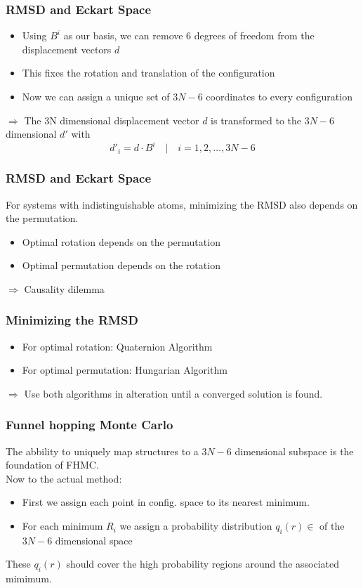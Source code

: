 \documentclass{beamer}
\begin{document}
	\begin{frame}
		\frametitle{RMSD and Eckart Space}
		\begin{itemize}
			\item Using $B^i$ as our basis, we can remove 6 degrees of freedom from the displacement vectors $d$
			\item This fixes the rotation and translation of the configuration
			\item Now we can assign a unique set of $3N-6$ coordinates to every configuration
		\end{itemize}
		$\Longrightarrow$ The 3N dimensional displacement vector $d$ is transformed to the $3N-6$ dimensional $d'$ with
		\begin{equation}
			d'_i=d\cdot B^i\quad|\quad i=1,2,\ldots, 3N-6
		\end{equation}
	\end{frame}

	\begin{frame}
		\frametitle{RMSD and Eckart Space}
		For systems with indistinguishable atoms, minimizing the RMSD also depends on the permutation.
		\begin{itemize}
			\item Optimal rotation depends on the permutation
			\item Optimal permutation depends on the rotation
		\end{itemize}
		$\Longrightarrow$ Causality dilemma
	\end{frame}

	\begin{frame}
		\frametitle{Minimizing the RMSD}
		\begin{itemize}
			\item For optimal rotation: Quaternion Algorithm \cite{Coutsias2004}
			\item For optimal permutation: Hungarian Algorithm \cite{Kuhn1955}
		\end{itemize}
		$\Longrightarrow$ Use both algorithms in alteration until a converged solution is found.
	\end{frame}

	\begin{frame}
		\frametitle{Funnel hopping Monte Carlo}
		The abbility to uniquely map structures to a $3N-6$ dimensional subspace is the foundation of FHMC.\\
		Now to the actual method:
		\begin{itemize}
			\item First we assign each point in config. space to its nearest minimum.
			\item For each minimum $R_i$ we assign a probability distribution $q_i(r)\in$ of the $3N-6$ dimensional space
		\end{itemize}	
		These $q_i(r)$ should cover the high probability regions around the associated mimimum.

	\end{frame}
\end{document}
